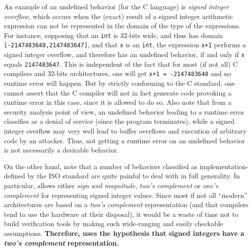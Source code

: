 An example of an undefined behavior (for the C language) is {\it signed integer
  overflow}, which occurs when the (exact) result of a signed integer arithmetic
expression can not be represented in the domain of the type of the
expressions. For instance, supposing that an \lstinline|int| is 32-bits wide,
and thus has domain \lstinline|[-2147483648,2147483647]|, and that \lstinline|x|
is an \lstinline|int|, the expression \lstinline|x+1| performs a signed integer
overflow, and therefore has an undefined behavior, if and only if \lstinline|x|
equals \lstinline|2147483647|.  This is independent of the fact that for most
(if not all) C compilers and 32-bits architectures, one will get
\lstinline|x+1 = -2147483648| and no runtime error will happen.  But by strictly
conforming to
the C standard, one cannot assert that the C compiler will not in fact generate
code provoking a runtime error in this case, since it is allowed to do so.
Also note that from a security analysis point of view, an undefined behavior
leading to a runtime error classifies as a denial of service (since the program
terminates), while a signed integer overflow may very well lead to buffer
overflows and execution of arbitrary code by an attacker. Thus, not getting a
runtime error on an undefined behavior is not necessarily a desirable behavior.

On the other hand, note that a number of behaviors classified as
implementation-defined by the ISO standard are quite painful to deal with in
full generality.  In particular, \cnn{} allows either {\it sign and magnitude},
{\it two's complement} or {\it one's complement} for representing signed integer
values.  Since most if not all ``modern'' architectures are based on a {\it
  two's complement} representation (and that compilers tend to use the hardware
at their disposal), it would be a waste of time not to build verification tools
by making such wide-ranging and easily checkable assumptions.  {\bf Therefore,
  \rte{} uses the hypothesis that signed integers have a {\it two's complement}
  representation.}



